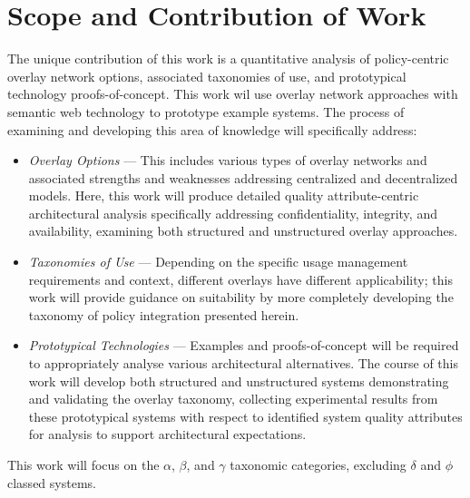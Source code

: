 \documentclass[12pt,letterpaper]{article}
\begin{document}
\section{Scope and Contribution of Work}
The unique contribution of this work is a quantitative analysis of policy-centric overlay network options, associated taxonomies of use, and prototypical technology proofs-of-concept.  This work wil use overlay network approaches with semantic web  technology to prototype example systems.  The process of examining and developing this area of knowledge will specifically address:
\begin{itemize}
\item \textit{Overlay Options} --- This includes various types of overlay networks and associated strengths and weaknesses addressing centralized and decentralized models.  Here, this work will produce detailed quality attribute-centric architectural analysis specifically addressing confidentiality, integrity, and availability, examining both structured and unstructured overlay approaches.
\item \textit{Taxonomies of Use} --- Depending on the specific usage management requirements and context, different overlays have different applicability; this work will provide guidance on suitability by more completely developing the taxonomy of policy integration presented herein.
\item \textit{Prototypical Technologies} --- Examples and proofs-of-concept will be required to appropriately analyse various architectural alternatives.  The course of this work will develop both structured and unstructured systems demonstrating and validating the overlay taxonomy, collecting experimental results from these prototypical systems with respect to identified system quality attributes for analysis to support architectural expectations.
\end{itemize}
This work will focus on the $\alpha$, $\beta$, and $\gamma$ taxonomic categories, excluding $\delta$ and $\phi$ classed systems.

\newpage



\end{document}
